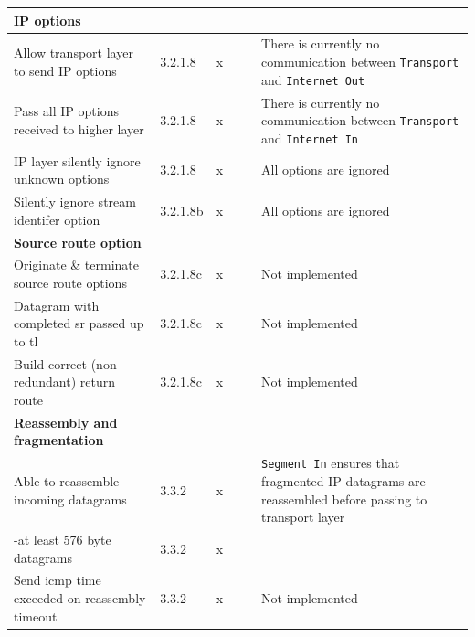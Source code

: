 \begin{longtable}{ | p{} | p{} | p{} |  p{} | p{} | p{} |}
\textbf{IP options} \\ \hline
  Allow transport layer to send IP options       &3.2.1.8 &x& & \cellcolor{red!25 }& There is currently no communication between \texttt{Transport} and \texttt{Internet Out}\\ \hline
  Pass all IP options received to higher layer       &3.2.1.8 &x& & \cellcolor{red!25 }& There is currently no communication between \texttt{Transport} and \texttt{Internet In}\\ \hline
  IP layer silently ignore unknown options       &3.2.1.8 &x& & \cellcolor{yellow!25}& All options are ignored\\ \hline
  Silently ignore stream identifer option        &3.2.1.8b&x& & \cellcolor{yellow!25 }& All options are ignored\\ \hline

\textbf{Source route option} \\ \hline
  Originate \& terminate source route options     &3.2.1.8c&x& & \cellcolor{red!25 }& Not implemented\\ \hline
  Datagram with completed sr passed up to tl     &3.2.1.8c&x& & \cellcolor{red!25 }& Not implemented\\ \hline
  Build correct (non-redundant) return route     &3.2.1.8c&x& & \cellcolor{red!25 }& Not implemented\\ \hline

\textbf{Reassembly and fragmentation} \\ \hline
  Able to reassemble incoming datagrams          &3.3.2   &x& & \cellcolor{green!25}& \texttt{Segment In} ensures that fragmented IP datagrams are reassembled before passing to transport layer\\ \hline
    -at least 576 byte datagrams                  &3.3.2   &x& & \cellcolor{green!25}\\ \hline
  Send icmp time exceeded on reassembly timeout  &3.3.2   &x& & \cellcolor{red!25 }& Not implemented\\ \hline


\end{longtable}
